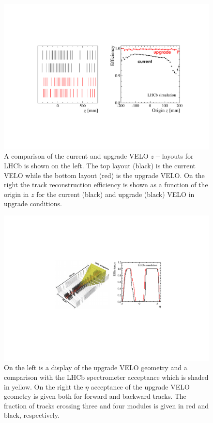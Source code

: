 \begin{figure}[t]
  \centerline{\includegraphics[width=\textwidth]{figures/lhcb_veloperf.pdf}}
  \caption{A comparison of the current and upgrade VELO $z-$layouts for LHCb is shown on the left. The top layout (black) is the current VELO while the bottom layout (red) is the upgrade VELO. On the right the track reconstruction efficiency is shown as a function of the origin in $z$ for the current (black) and upgrade (black) VELO in upgrade conditions.}
  \label{fig:eff}
\end{figure}

\begin{figure}[h]
\centerline{\includegraphics[width=\textwidth]{figures/lhcb_veloacceptance2.pdf}}
  \caption{On the left is a display of the upgrade VELO geometry and a comparison with the LHCb spectrometer acceptance which is shaded in yellow. On the right the $\eta$ acceptance of the upgrade VELO geometry is given both for forward and backward tracks. The fraction of tracks crossing three and four modules is given in red and black, respectively.}
  \label{fig:ulhcb_veloacc}
\end{figure}

